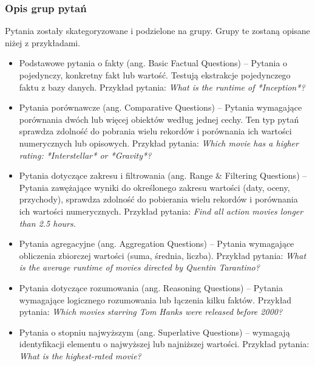 \documentclass[
a4paper,
12pt,
]{article}
\begin{document}
\subsubsection{Opis grup pytań}

Pytania zostały skategoryzowane i podzielone na grupy. Grupy te zostaną opisane niżej z przykładami.

\begin{itemize}
    \item Podstawowe pytania o fakty (ang. Basic Factual Questions) -- Pytania o pojedynczy, konkretny fakt lub wartość. 
    Testują ekstrakcje pojedynczego faktu z bazy danych.
    Przykład pytania: 
    \textit{What is the runtime of *Inception*?}

    \item Pytania porównawcze (ang. Comparative Questions) -- Pytania wymagające porównania dwóch lub więcej obiektów według jednej cechy.  Ten typ pytań sprawdza zdolność do pobrania wielu rekordów i porównania ich wartości numerycznych lub opisowych.
    Przykład pytania: 
    \textit{Which movie has a higher rating: *Interstellar* or *Gravity*?}

    \item Pytania dotyczące zakresu i filtrowania (ang. Range \& Filtering Questions) -- Pytania zawężające wyniki do określonego zakresu wartości (daty, oceny, przychody), sprawdza zdolność do pobierania wielu rekordów i porównania ich wartości numerycznych. 
    Przykład pytania: 
    \textit{Find all action movies longer than 2.5 hours.}

    \item Pytania agregacyjne (ang. Aggregation Questions) -- Pytania wymagające obliczenia \linebreak{}
    zbiorczej wartości (suma, średnia, liczba). 
    Przykład pytania: 
    \textit{What is the average runtime of movies directed by Quentin Tarantino?}

    \item Pytania dotyczące rozumowania (ang. Reasoning Questions) -- Pytania wymagające logicznego rozumowania lub łączenia kilku faktów.
    Przykład pytania: 
    \textit{Which movies starring Tom Hanks were released before 2000?}

    \item Pytania o stopniu najwyższym (ang. Superlative Questions) -- wymagają identyfikacji elementu o najwyższej lub najniższej wartości.
    Przykład pytania: 
    \textit{What is the highest-rated movie?}


\end{itemize}
\end{document}
